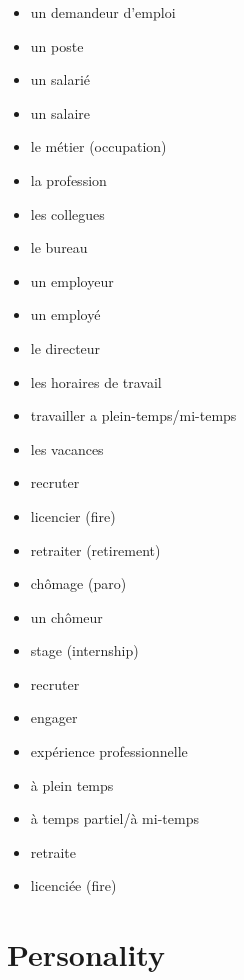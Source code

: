 \documentclass[palatino]{nicenotes}
\begin{document}
\begin{multicols}{3}
\begin{itemize}
\item un demandeur d'emploi
\item un poste
\item un salarié
\item un salaire
\item le métier (occupation)
\item la profession
\item les collegues
\item le bureau
\item un employeur
\item un employé
\item le directeur
\item les horaires de travail
\item travailler a plein-temps/mi-temps
\item les vacances
\item recruter
\item licencier (fire)
\item retraiter (retirement)
\item chômage (paro)
\item un chômeur
\item stage (internship)
\item recruter
\item engager
\item expérience professionnelle
\item à plein temps
\item à temps partiel/à mi-temps
\item retraite
\item licenciée (fire)
\end{itemize}
\end{multicols}

\section{Personality}
\end{document}
